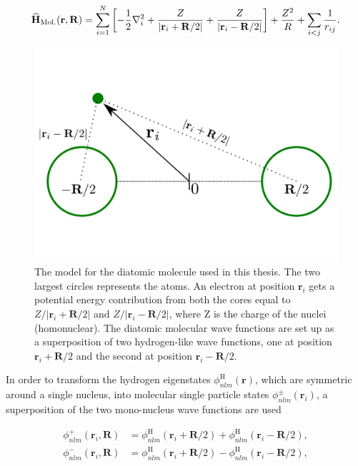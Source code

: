 \begin{equation}
 {\bf\widehat{H}}_{\mathrm{Mol.}}(\mathbf{r}, \mathbf{R}) = \sum_{i=1}^N \left[-\frac{1}{2}\nabla_i^2 + \frac{Z}{|\mathbf{r}_i + \mathbf{R}/2|} + \frac{Z}{|\mathbf{r}_i - \mathbf{R}/2|}\right] + \frac{Z^2}{R} + \sum_{i<j} \frac{1}{r_{ij}}.
\end{equation}



\begin{figure}
 \begin{center}
  \includegraphics[scale=0.3]{../Graphics/Molecules.pdf}
  \caption{The model for the diatomic molecule used in this thesis. The two largest circles represents the atoms. An electron at position $\mathbf{r}_i$ gets a potential energy contribution from both the cores equal to $Z/|\mathbf{r}_i + \mathbf{R}/2|$ and  $Z/|\mathbf{r}_i - \mathbf{R}/2|$, where Z is the charge of the nuclei (homonuclear). The diatomic molecular wave functions are set up as a superposition of two hydrogen-like wave functions, one at position $\mathbf{r}_i + \mathbf{R}/2$ and the second at position $\mathbf{r}_i - \mathbf{R}/2$.}
  \label{fig:dimolecules}
 \end{center}
\end{figure}


In order to transform the hydrogen eigenstates $\phi_{nlm}^\mathrm{H}(\mathbf{r})$, which are symmetric around a single nucleus, into molecular single particle states $\phi_{nlm}^\pm (\mathbf{r}_i)$, a superposition of the two mono-nucleus wave functions are used

\begin{align}
 \phi_{nlm}^+ (\mathbf{r}_i, \mathbf{R}) &= \phi_{nlm}^\mathrm{H}(\mathbf{r}_i + \mathbf{R}/2) + \phi_{nlm}^\mathrm{H}(\mathbf{r}_i - \mathbf{R}/2)\label{eq:moleculeTransPlus}, \\
 \phi_{nlm}^- (\mathbf{r}_i, \mathbf{R}) &= \phi_{nlm}^\mathrm{H}(\mathbf{r}_i + \mathbf{R}/2) - \phi_{nlm}^\mathrm{H}(\mathbf{r}_i - \mathbf{R}/2)\label{eq:moleculeTransMin},
\end{align}

